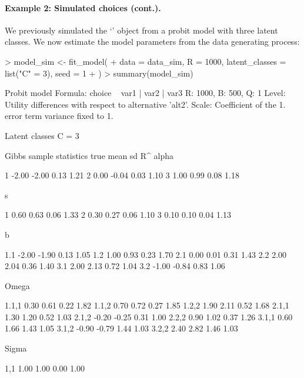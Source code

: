 \documentclass[article,shortnames]{jss}
\newcommand{\class}[1]{`\code{#1}'}
\begin{document}
\paragraph{Example 2: Simulated choices (cont.).}

We previously simulated the \class{RprobitB\_data} object  from a probit model with three latent classes. We now estimate the model parameters from the data generating process:

\begin{Schunk}
\begin{Sinput}
> model_sim <- fit_model(
+    data = data_sim, R = 1000, latent_classes = list("C" = 3), seed = 1
+  )
> summary(model_sim)
\end{Sinput}
\begin{Soutput}
Probit model
Formula: choice ~ var1 | var2 | var3 
R: 1000, B: 500, Q: 1
Level: Utility differences with respect to alternative 'alt2'.
Scale: Coefficient of the 1. error term variance fixed to 1.

Latent classes
C = 3 

Gibbs sample statistics
          true    mean      sd      R^
 alpha
                                      
     1   -2.00   -2.00    0.13    1.21
     2    0.00   -0.04    0.03    1.10
     3    1.00    0.99    0.08    1.18

 s
                                      
     1    0.60    0.63    0.06    1.33
     2    0.30    0.27    0.06    1.10
     3    0.10    0.10    0.04    1.13

 b
                                      
   1.1   -2.00   -1.90    0.13    1.05
   1.2    1.00    0.93    0.23    1.70
   2.1    0.00    0.01    0.31    1.43
   2.2    2.00    2.04    0.36    1.40
   3.1    2.00    2.13    0.72    1.04
   3.2   -1.00   -0.84    0.83    1.06

 Omega
                                      
 1.1,1    0.30    0.61    0.22    1.82
 1.1,2    0.70    0.72    0.27    1.85
 1.2,2    1.90    2.11    0.52    1.68
 2.1,1    1.30    1.20    0.52    1.03
 2.1,2   -0.20   -0.25    0.31    1.00
 2.2,2    0.90    1.02    0.37    1.26
 3.1,1    0.60    1.66    1.43    1.05
 3.1,2   -0.90   -0.79    1.44    1.03
 3.2,2    2.40    2.82    1.46    1.03

 Sigma
                                      
   1,1    1.00    1.00    0.00    1.00
\end{Soutput}
\end{Schunk}
\end{document}
